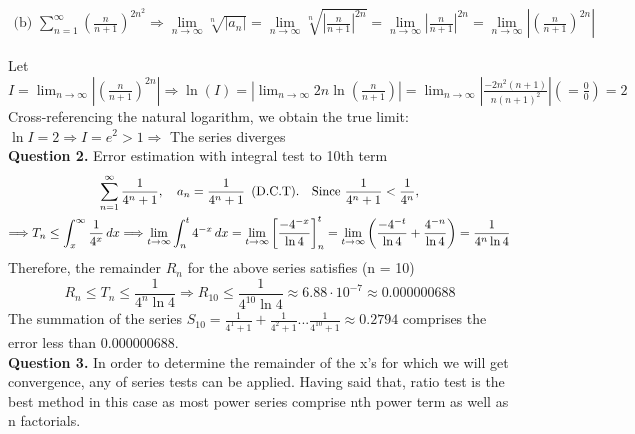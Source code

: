 \documentclass[a4paper]{exam}
\begin{document}
	\begin{multline*}
		\text{(b) } \sum_{n = 1}^{\infty} \left(\frac{n}{n + 1}\right)^{2n^{2}} \Longrightarrow \lim_{n \to \infty} \sqrt[n]{\left| a_{n} \right|} = \lim_{n \to \infty} \sqrt[n]{\left| \frac{n}{n + 1} \right|^{2n}} = \lim_{n \to \infty} \left| \frac{n}{n + 1} \right|^{2n} = \lim_{n \to \infty} \left| \left( \frac{n}{n + 1} \right)^{2n} \right|
	\end{multline*}
	
	\noindent Let $I = \lim_{n \to \infty} \left| \left( \frac{n}{n + 1} \right)^{2n} \right| \Longrightarrow \ln(I) = \left| \lim_{n \to \infty} 2n \ln\left( \frac{n}{n + 1} \right) \right| = \lim_{n \to \infty} \left|\frac{-2n^{2}(n + 1)}{n(n + 1)^{2}}\right| \left( = \frac{0}{0} \right) = 2$\\[0.5em]
	
	\noindent Cross-referencing the natural logarithm, we obtain the true limit: $\ln I = 2 \Longrightarrow I = e^{2} > 1 \Longrightarrow$ The series diverges \\[0.5em]
	\noindent \textbf{Question 2.} Error estimation with integral test to 10th term
	\begin{multline*}
		\sum_{n = 1}^{\infty} \frac{1}{4^{n} + 1}, \quad 
		a_{n} = \frac{1}{4^{n} + 1} \hspace{0.5em} \text{(D.C.T)}. \quad
		\text{Since } \frac{1}{4^{n} + 1} < \frac{1}{4^{n}}, \\
		\Longrightarrow T_{n} \leq \int_{x}^{\infty} \frac{1}{4^{x}} \, dx 
		\Longrightarrow \lim_{t \to \infty} \int_{n}^{t} 4^{-x} \, dx 
		= \lim_{t \to \infty} \left[ \frac{-4^{-x}}{\ln 4} \right]_{n}^{t} 
		= \lim_{t \to \infty} \left( \frac{-4^{-t}}{\ln 4} + \frac{4^{-n}}{\ln 4} \right) 
		= \frac{1}{4^{n} \ln 4}
	\end{multline*}
	\noindent Therefore, the remainder $R_{n}$ for the above series satisfies (n = 10)
	$$ R_{n} \leq T_{n} \leq \frac{1}{4^{n} \ln 4} \Longrightarrow R_{10} \leq \frac{1}{4^{10} \ln 4} \approx 6.88 \cdot 10^{-7} \approx 0.000000688$$
	\noindent The summation of the series $S_{10} = \frac{1}{4^{1} + 1} + \frac{1}{4^{2} + 1} ... \frac{1}{4^{10} + 1} \approx 0.2794$ comprises the error less than 0.000000688.\\[0.5em]
	\noindent \textbf{Question 3.} In order to determine the remainder of the x's for which we will get convergence, any of series tests can be applied. Having said that, ratio test is the best method in this case as most power series comprise nth power term as well as n factorials. \\
	
\end{document}
